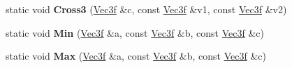 \begin{DoxyCompactItemize}
\item 
\hypertarget{classVec3f_a07d559fa6f6b5809daeba8ae99051360}{static void {\bfseries \-Cross3} (\hyperlink{classVec3f}{\-Vec3f} \&c, const \hyperlink{classVec3f}{\-Vec3f} \&v1, const \hyperlink{classVec3f}{\-Vec3f} \&v2)}\label{classVec3f_a07d559fa6f6b5809daeba8ae99051360}

\item 
\hypertarget{classVec3f_aa7d7a2d18d4223baa56aab1af7602960}{static void {\bfseries \-Min} (\hyperlink{classVec3f}{\-Vec3f} \&a, const \hyperlink{classVec3f}{\-Vec3f} \&b, const \hyperlink{classVec3f}{\-Vec3f} \&c)}\label{classVec3f_aa7d7a2d18d4223baa56aab1af7602960}

\item 
\hypertarget{classVec3f_a06c5a88aefac724277f118b24df6bd0a}{static void {\bfseries \-Max} (\hyperlink{classVec3f}{\-Vec3f} \&a, const \hyperlink{classVec3f}{\-Vec3f} \&b, const \hyperlink{classVec3f}{\-Vec3f} \&c)}\label{classVec3f_a06c5a88aefac724277f118b24df6bd0a}

\end{DoxyCompactItemize}
